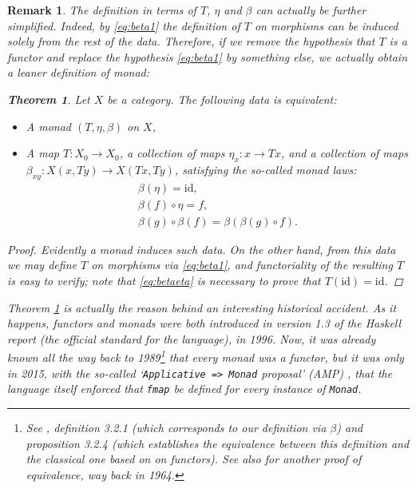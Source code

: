 \documentclass[11pt]{article}
\newtheorem{theorem}{Theorem}
\newtheorem{remark}{Remark}
\theoremstyle{nonumberplain}
\newtheorem{proof}{Proof}
\newcommand{\id}{\mathrm{id}}
\newcommand*\lsin{\lstinline}
\begin{document}
\begin{remark}
The definition in terms of $T$, $\eta$ and $\beta$ can actually be further simplified. Indeed, by \eqref{eq:beta1} the definition of $T$ on morphisms can be induced solely from the rest of the data. Therefore, if we remove the hypothesis that $T$ is a functor and replace the hypothesis \eqref{eq:beta1} by something else, we actually obtain a leaner definition of monad:

\begin{theorem}\label{thm:mon2}
Let $X$ be a category. The following data is equivalent:
\begin{itemize}
\item A monad $(T, \eta, \beta)$ on $X$,
\item A map $T \colon X_0 \to X_0$, a collection of maps $\eta_x \colon x \to Tx$, and a collection of maps $\beta_{xy} \colon X(x, Ty) \to X(Tx,Ty)$, satisfying the so-called \emph{monad laws}:
\begin{gather}
\beta(\eta) = \id,\label{eq:betaeta}\\
\beta(f) \circ \eta = f,\\
\beta(g) \circ \beta(f) = \beta(\beta(g) \circ f).
\end{gather}
\end{itemize}
\end{theorem}

\begin{proof}
Evidently a monad induces such data. On the other hand, from this data we may define $T$ on morphisms via \eqref{eq:beta1}, and functoriality of the resulting $T$ is easy to verify; note that \eqref{eq:betaeta} is necessary to prove that $T(\id) = \id$.
\end{proof}

Theorem \ref{thm:mon2} is actually the reason behind an interesting historical accident. As it happens, functors and monads were both introduced in version 1.3 of the Haskell report (the official standard for the language), in 1996. Now, it was already known all the way back to 1989\footnote{See \cite{moggi1}, definition 3.2.1 (which corresponds to our definition via $\beta$) and proposition 3.2.4 (which establishes the equivalence between this definition and the classical one based on on functors). See also \cite{kleisli} for another proof of equivalence, way back in 1964.} that every monad was a functor, but it was only in 2015, with the so-called `\lsin|Applicative => Monad| proposal' (AMP) \cite{amp}, that the language itself enforced that \lsin|fmap| be defined for every instance of \lsin|Monad|. 
\end{remark}
\end{document}
